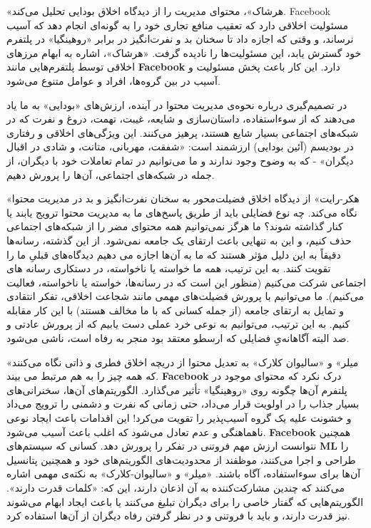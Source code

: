 \documentclass[12pt,oneside]{book}
\begin{document}
    «هرشاک»، محتوای مدیریت را از دیدگاه اخلاق بودایی تحلیل می‌کند.
    Facebook مسئولیت اخلاقی دارد که تعقیب منافع تجاری خود را به گونه‌ای انجام دهد که آسیب نرساند، و وقتی که اجازه داد تا سخنان بد و نفرت‌انگیز در برابر «روهینگیا» در پلتفرم خود گسترش یابد، این مسئولیت‌ها را نادیده گرفت.
    «هرشاک»، اشاره به ابهام مرزهای اخلاقی توسط پلتفرم‌هایی مانند \textenglish{\textbf{Facebook}} دارد.
    این کار باعث پخش مسئولیت و آسیب در بین گروه‌ها، افراد و عوامل متنوع می‌شود.

    در تصمیم‌گیری درباره نحوه‌ی مدیریت محتوا در آینده، ارزش‌های «بودایی» به ما یاد می‌دهند که از سوءاستفاده، داستان‌سازی و شایعه، غیبت، تهمت، دروغ و نفرت که در شبکه‌های اجتماعی بسیار شایع هستند، پرهیز می‌کنند.
    این ویژگی‌های اخلاقی و رفتاری در بودیسم (آئین بودایی) ارزشمند است: «شفقت، مهربانی، متانت، و شادی در اقبال دیگران» - که به وضوح وجود ندارند و ما می‌توانیم در تمام تعاملات خود با دیگران، از جمله در شبکه‌های اجتماعی، آن‌ها را پرورش دهیم.

    «هکر-رایت» از دیدگاه اخلاق فضیلت‌محور به سخنان نفرت‌انگیز و بد در مدیریت محتوا نگاه می‌کند.
    چه نوع فضایلی باید از طریق پاسخ‌های ما به مدیریت محتوا ترویج یابند یا کنار گذاشته شوند؟ ما هرگز نمی‌توانیم همه محتوای مضر را از شبکه‌های اجتماعی حذف کنیم، و این به تنهایی باعث ارتقای یک جامعه نمی‌شود.
    از این گذشته، رسانه‌ها دقیقاً به این دلیل مؤثر هستند که ما به آن‌ها اجازه می دهیم دیدگاه‌های قبلیِ ما را تقویت کنند.
    به این ترتیب، همه ما خواسته یا ناخواسته، در دستکاری رسانه های اجتماعی شرکت می‌کنیم (منظور این است که در رسانه‌ها، خواسته یا ناخواسته، فعالیت می‌کنیم).
    ما می‌توانیم با پرورش فضیلت‌های مهمی مانند شجاعت اخلاقی، تفکر انتقادی و تمایل به ارتقای جامعه (از جمله کسانی که با ما مخالف هستند) با این کار مقابله کنیم.
    به این ترتیب، می‌توانیم به نوعی خرد عملی دست یابیم که از پرورش عادتی و صد البته آگاهانه‌یِ فضایلی که ارسطو معتقد بود منجر به رفاه است، ناشی می‌شود.

    «میلر» و «سالیوان کلارک» به تعدیل محتوا از دریچه اخلاق فطری و ذاتی نگاه می‌کنند که همه چیز را به هم مرتبط می بیند.
    \textenglish{\textbf{Facebook}} درک نکرد که محتوای موجود در پلتفرم آن‌ها چگونه روی «روهینگیا» تأثیر می‌گذارد.
    الگوریتم‌های آن‌ها، سخنرانی‌های بسیار جذاب را در اولویت قرار می‌داد، حتی زمانی که نفرت و دشمنی را ترویج می‌داد و خشونت علیه یک گروه آسیب‌پذیر را تقویت می‌کرد!
    این اقدامات باعث ایجاد نوعی ناهماهنگی و عدم تعادل می‌شود که اغلب باعث آسیب می‌شود.
    \textenglish{\textbf{Facebook}} همچنین نتوانست ارزش مهم فروتنی در تفکر را پرورش دهد.
    کسانی که سیستم‌های \textenglish{\textbf{ML}} را طراحی و اجرا می‌کنند، موظفند از محدودیت‌های الگوریتم‌های خود و همچنین پتانسیل آن‌ها برای سوءاستفاده، آگاه باشند.
    «میلر» و «سالیوان-کلارک» به نکته‌ی مهمی اشاره می‌کنند که چندین مشارکت‌کننده به آن اذعان دارند، این که: «کلمات قدرت دارند».
    الگوریتم‌هایی که گفتار خاصی را برای دیگران تبلیغ می‌کنند یا باعث ایجاد ابهام می‌شوند نیز قدرت دارند، و باید با فروتنی و در نظر گرفتن رفاه دیگران از آن‌ها استفاده کرد.
\end{document}

